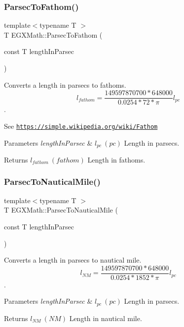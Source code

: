 \subsubsection{\texorpdfstring{Parsec\+To\+Fathom()}{ParsecToFathom()}}
{\footnotesize\ttfamily template$<$typename T $>$ \\
T E\+G\+X\+Math\+::\+Parsec\+To\+Fathom (\begin{DoxyParamCaption}\item[{const T}]{length\+In\+Parsec }\end{DoxyParamCaption})}



Converts a length in parsecs to fathoms. \[ l_{fathom}= \frac{149597870700 * 648000}{0.0254 * 72 * \pi} l_{pc} \]. 

See \href{https://simple.wikipedia.org/wiki/Fathom}{\tt https\+://simple.\+wikipedia.\+org/wiki/\+Fathom} 
\begin{DoxyParams}{Parameters}
{\em length\+In\+Parsec} & $ l_{pc}\ (pc)$ Length in parsecs. \\
\hline
\end{DoxyParams}
\begin{DoxyReturn}{Returns}
$ l_{fathom}\ (fathom)$ Length in fathoms. 
\end{DoxyReturn}
\mbox{\label{group___e_g_x_math-_conversions-_length_conversions-_astronomical-_parsec-_nautical_ga34adb714e6f4da104b25e2b5a2ab114e}} 
\subsubsection{\texorpdfstring{Parsec\+To\+Nautical\+Mile()}{ParsecToNauticalMile()}}
{\footnotesize\ttfamily template$<$typename T $>$ \\
T E\+G\+X\+Math\+::\+Parsec\+To\+Nautical\+Mile (\begin{DoxyParamCaption}\item[{const T}]{length\+In\+Parsec }\end{DoxyParamCaption})}



Converts a length in parsecs to nautical mile. \[ l_{NM}= \frac{149597870700 * 648000}{0.0254 * 1852 * \pi} l_{pc} \]. 


\begin{DoxyParams}{Parameters}
{\em length\+In\+Parsec} & $ l_{pc}\ (pc)$ Length in parsecs. \\
\hline
\end{DoxyParams}
\begin{DoxyReturn}{Returns}
$ l_{NM}\ (NM)$ Length in nautical mile. 
\end{DoxyReturn}
